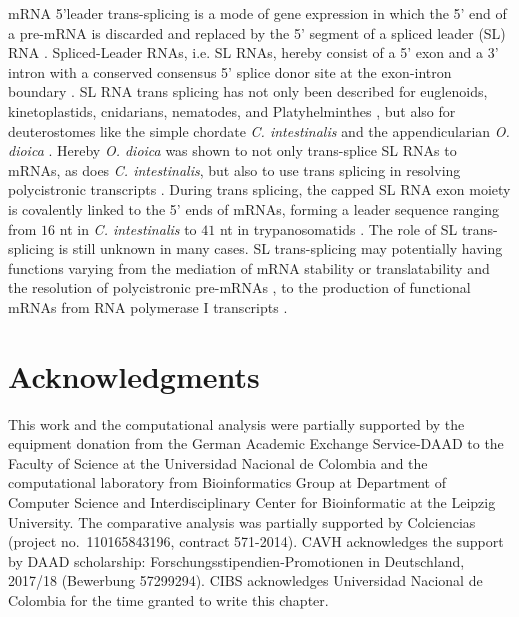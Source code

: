 \documentclass[graybox]{svmult}
\begin{document}
mRNA 5'leader trans-splicing is a mode of gene expression in which the 5' end 
of a pre-mRNA is discarded and replaced by the 5' segment of a spliced leader 
(SL) RNA \cite{Vandenberghe2001}. Spliced-Leader RNAs, i.e. SL RNAs, hereby 
consist of a 5' exon and a 3' intron with a conserved consensus 5' splice donor 
site at the exon-intron boundary \cite{Ganot2004}. SL RNA trans splicing has 
not only been described for euglenoids, kinetoplastids, cnidarians, nematodes, 
and Platyhelminthes \cite{Ganot2004}, but also for deuterostomes like the simple 
chordate \textit{C. intestinalis} \cite{Vandenberghe2001} and the 
appendicularian \textit{O. dioica} \cite{Ganot2004}. Hereby \textit{O. dioica} 
was shown to not only trans-splice SL RNAs to mRNAs, as does \textit{C. 
intestinalis}, but also to use trans splicing in resolving polycistronic 
transcripts \cite{Ganot2004}. During trans splicing, the capped SL RNA exon 
moiety is covalently linked to the 5' ends of mRNAs, forming a leader sequence 
ranging from $16$ nt in \textit{C. intestinalis} to $41$ nt in trypanosomatids 
\cite{Ganot2004}. The role of SL trans-splicing is still unknown in many cases. 
SL trans-splicing may potentially having functions varying from the mediation 
of mRNA stability or translatability \cite{Maroney1995} and the resolution 
of polycistronic pre-mRNAs \cite{Agabian1990, Blumenthal1995}, to the 
production of functional mRNAs from RNA polymerase I 
transcripts \cite{ShuLee1997}.

\section{Acknowledgments}
This work and the computational analysis were partially supported by the 
equipment donation from the German Academic Exchange Service-DAAD to the Faculty 
of Science at the Universidad Nacional de Colombia and the computational 
laboratory from Bioinformatics Group at Department of Computer Science and 
Interdisciplinary Center for Bioinformatic at the Leipzig University. The 
comparative analysis was partially supported by Colciencias (project no.\ 
110165843196, contract 571-2014). CAVH acknowledges the support by DAAD 
scholarship: Forschungsstipendien-Promotionen in Deutschland, 2017/18 (Bewerbung 
57299294). CIBS acknowledges Universidad Nacional de Colombia for the time 
granted to write this chapter.



%
\end{document}
